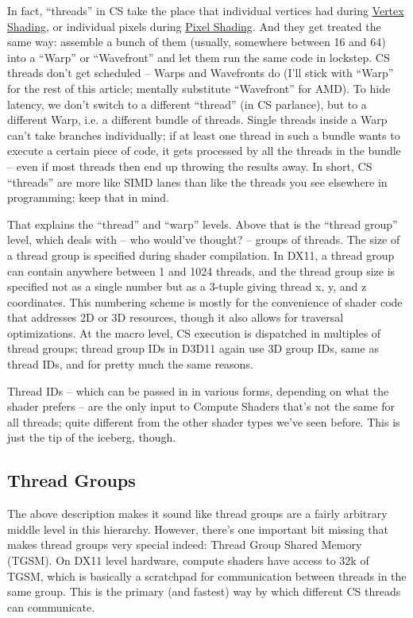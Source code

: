 \documentclass[12pt]{article}
\begin{document}
In fact, “threads” in CS take the place that individual vertices had during \href{https://fgiesen.wordpress.com/2011/07/03/a-trip-through-the-graphics-pipeline-2011-part-3/}{Vertex Shading}, or individual pixels during \href{https://fgiesen.wordpress.com/2011/07/10/a-trip-through-the-graphics-pipeline-2011-part-8/}{Pixel Shading}. And they get treated the same way: assemble a bunch of them (usually, somewhere between 16 and 64) into a “Warp” or “Wavefront” and let them run the same code in lockstep. CS threads don’t get scheduled – Warps and Wavefronts do (I’ll stick with “Warp” for the rest of this article; mentally substitute “Wavefront” for AMD). To hide latency, we don’t switch to a different “thread” (in CS parlance), but to a different Warp, i.e. a different bundle of threads. Single threads inside a Warp can’t take branches individually; if at least one thread in such a bundle wants to execute a certain piece of code, it gets processed by all the threads in the bundle – even if most threads then end up throwing the results away. In short, CS “threads” are more like SIMD lanes than like the threads you see elsewhere in programming; keep that in mind.

That explains the “thread” and “warp” levels. Above that is the “thread group” level, which deals with – who would’ve thought? – groups of threads. The size of a thread group is specified during shader compilation. In DX11, a thread group can contain anywhere between 1 and 1024 threads, and the thread group size is specified not as a single number but as a 3-tuple giving thread x, y, and z coordinates. This numbering scheme is mostly for the convenience of shader code that addresses 2D or 3D resources, though it also allows for traversal optimizations. At the macro level, CS execution is dispatched in multiples of thread groups; thread group IDs in D3D11 again use 3D group IDs, same as thread IDs, and for pretty much the same reasons.

Thread IDs – which can be passed in in various forms, depending on what the shader prefers – are the only input to Compute Shaders that’s not the same for all threads; quite different from the other shader types we’ve seen before. This is just the tip of the iceberg, though.

\subsection{Thread Groups}
\label{sec:orga2c1496}

The above description makes it sound like thread groups are a fairly arbitrary middle level in this hierarchy. However, there’s one important bit missing that makes thread groups very special indeed: Thread Group Shared Memory (TGSM). On DX11 level hardware, compute shaders have access to 32k of TGSM, which is basically a scratchpad for communication between threads in the same group. This is the primary (and fastest) way by which different CS threads can communicate.
\end{document}
